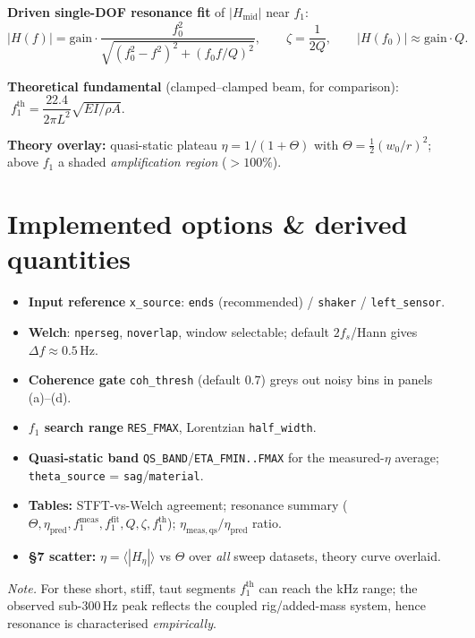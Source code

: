 \documentclass[11pt,a4paper]{article}
\newcommand{\unit}[1]{\,\mathrm{#1}}
\begin{document}
\textbf{Driven single-DOF resonance fit} of $|H_{\mathrm{mid}}|$ near $f_1$:
\begin{equation}
|H(f)|=\mathrm{gain}\cdot\frac{f_0^2}{\sqrt{(f_0^2-f^2)^2+(f_0 f/Q)^2}},
\qquad \zeta=\frac{1}{2Q},\qquad |H(f_0)|\approx \mathrm{gain}\cdot Q.
\end{equation}

\textbf{Theoretical fundamental} (clamped--clamped beam, for comparison):
$\;f_1^{\mathrm{th}}=\dfrac{22.4}{2\pi L^2}\sqrt{EI/\rho A}.$

\textbf{Theory overlay:} quasi-static plateau $\eta=1/(1+\Theta)$ with $\Theta=\tfrac12(w_0/r)^2$;
above $f_1$ a shaded \emph{amplification region} ($>100\%$).

\section*{Implemented options \& derived quantities}
\begin{itemize}
\item \textbf{Input reference} \texttt{x\_source}: \texttt{ends} (recommended) / \texttt{shaker} / \texttt{left\_sensor}.
\item \textbf{Welch}: \texttt{nperseg}, \texttt{noverlap}, window selectable; default $2f_s$/Hann gives $\Delta f\!\approx\!0.5\unit{Hz}$.
\item \textbf{Coherence gate} \texttt{coh\_thresh} (default $0.7$) greys out noisy bins in panels (a)--(d).
\item \textbf{$f_1$ search range} \texttt{RES\_FMAX}, Lorentzian \texttt{half\_width}.
\item \textbf{Quasi-static band} \texttt{QS\_BAND}/\texttt{ETA\_FMIN..FMAX} for the measured-$\eta$ average; \texttt{theta\_source} = \texttt{sag}/\texttt{material}.
\item \textbf{Tables:} STFT-vs-Welch agreement; resonance summary ($\Theta,\eta_{\mathrm{pred}},f_1^{\mathrm{meas}},f_1^{\mathrm{fit}},Q,\zeta,f_1^{\mathrm{th}}$); $\eta_{\mathrm{meas,qs}}/\eta_{\mathrm{pred}}$ ratio.
\item \textbf{\S7 scatter:} $\eta=\langle|H_\eta|\rangle$ vs $\Theta$ over \emph{all} sweep datasets, theory curve overlaid.
\end{itemize}

\footnotesize\noindent\emph{Note.} For these short, stiff, taut segments $f_1^{\mathrm{th}}$ can reach the kHz range; the observed sub-$300\unit{Hz}$ peak reflects the coupled rig/added-mass system, hence resonance is characterised \emph{empirically}.
\end{document}
